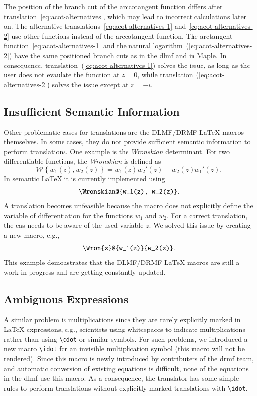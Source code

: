 \documentclass[a4paper,11pt]{article}
\newcommand{\DLMF}{DLMF}
\newcommand{\DRMF}{DRMF}
\newcommand{\Maple}{Maple}
\newcommand{\Macro}{\DLMF/\DRMF{} \LaTeX{} macro}
\theoremstyle{defTheoStyle}
\theoremstyle{defExampStyle}
\DeclareRobustCommand{\iunit}{{i}}
\begin{document}
\vspace{-0.2cm}
The position of the branch cut of the arccotangent function differs after translation~\eqref{eq:acot-alternatives}, which may lead to incorrect calculations later on. The alternative translations~\eqref{eq:acot-alternatives-1} and~\eqref{eq:acot-alternatives-2} use other functions instead of the arccotangent function. The arctangent function~\eqref{eq:acot-alternatives-1} and the natural logarithm~(\ref{eq:acot-alternatives-2}) have the same positioned branch cuts as in the \gls*{dlmf} and in \Maple. In consequence, translation~(\ref{eq:acot-alternatives-1}) solves the issue, as long as the user does not evaulate the function at $z = 0$, while translation~(\ref{eq:acot-alternatives-2}) solves the issue except at $z = -\iunit$.

\subsection{Insufficient Semantic Information}
Other problematic cases for translations are the \Macro s themselves. In some cases, they do not provide sufficient semantic information to perform translations. One example is the \textit{Wronskian} determinant. For two differentiable functions, the \textit{Wronskian} is defined as~\parencite[(1.13.4)]{NIST:DLMF}
\begin{equation*}
	\mathscr{W} \left\{ w_1(z), w_2(z) \right\} = w_1(z)w_2'(z) - w_2(z)w_1'(z).
\end{equation*}
In semantic \LaTeX{} it is currently implemented using
\begin{equation}
	\verb|\Wronskian@{w_1(z), w_2(z)}|.
\end{equation}
A translation becomes unfeasible because the macro does not explicitly define the variable of differentiation for the functions $w_1$ and $w_2$. For a correct translation, the \gls*{cas} needs to be aware of the used variable $z$. We solved this issue by creating a new macro, e.g.,
\begin{equation}
	\verb|\Wron{z}@{w_1(z)}{w_2(z)}|.
\end{equation}
This example demonstrates that the \Macro s are still a work in progress and are getting constantly updated.

\subsection{Ambiguous Expressions}
A similar problem is multiplications since they are rarely explicitly marked in \LaTeX{} expressions, e.g., scientists using whitespaces to indicate multiplications rather than using \verb|\cdot| or similar symbols. For such problems, we introduced a new macro \verb|\idot| for an invisible multiplication symbol (this macro will not be rendered). Since this macro is newly introduced by contributers of the \gls*{drmf} team, and automatic conversion of existing equations is difficult, none of the equations in the \gls*{dlmf} use this macro. As a consequence, the translator has some simple rules to perform translations without explicitly marked translations with \verb|\idot|.
\end{document}
